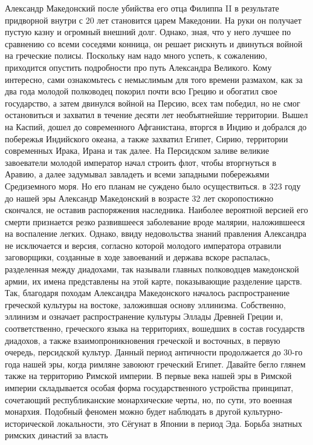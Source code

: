 Александр Македонский после убийства его отца Филиппа II в результате придворной
внутри с 20 лет становится царем Македонии. На руки он получает пустую казну и
огромный внешний долг. Однако, зная, что у него лучшее по сравнению со всеми
соседями конница, он решает рискнуть и двинуться войной на греческие полисы.
Поскольку нам надо много успеть, к сожалению, приходится опустить подробности
про путь Александра Великого. Кому интересно, сами ознакомьтесь с немыслимым для
того времени размахом, как за два года молодой полководец покорил почти всю
Грецию и обогатил свое государство, а затем двинулся войной на Персию, всех там
победил, но не смог остановиться и захватил в течение десяти лет необъятнейшие
территории. Вышел на Каспий, дошел до современного Афганистана, вторгся в Индию
и добрался до побережья Индийского океана, а также захватил Египет, Сирию,
территории современных Ирака, Ирана и так далее. На Персидском заливе великие
завоеватели молодой император начал строить флот, чтобы вторгнуться в Аравию, а
далее задумывал завладеть и всеми западными побережьями Средиземного моря. Но
его планам не суждено было осуществиться. в 323 году до нашей эры Александр
Македонский в возрасте 32 лет скоропостижно скончался, не оставив распоряжения
наследника. Наиболее вероятной версией его смерти признается резко развившееся
заболевание вроде малярии, наложившееся на воспаление легких. Однако, ввиду
недовольства знаний правления Александра не исключается и версия, согласно
которой молодого императора отравили заговорщики, созданные в ходе завоеваний и
держава вскоре распалась, разделенная между диадохами, так называли главных
полководцев македонской армии, их имена представлены на этой карте, показывающие
разделение царств. Так, благодаря походам Александра Македонского началось
распространение греческой культуры на востоке, заложившая основу эллинизма.
Собственно, эллинизм и означает распространение культуры Эллады Древней Греции
и, соответственно, греческого языка на территориях, вошедших в состав государств
диадохов, а также взаимопроникновения греческой и восточных, в первую очередь,
персидской культур. Данный период античности продолжается до 30-го года нашей
эры, когда римляне завоюют греческий Египет. Давайте бегло глянем также на
территорию Римской империи. В первые века нашей эры в Римской империи
складывается особая форма государственного устройства принципат, сочетающий
республиканские монархические черты, но, по сути, это военная монархия. Подобный
феномен можно будет наблюдать в другой культурно-исторической локальности, это
Сёгунат в Японии в период Эда. Борьба знатных римских династий за власть
